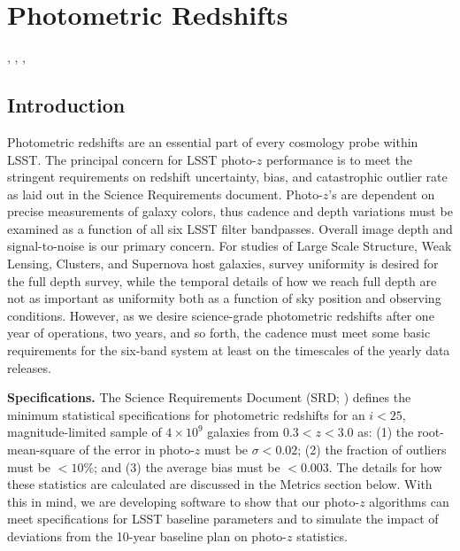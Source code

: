 %
%
%
%
%
%
\clearpage
\section{Photometric Redshifts}
\def\secname{photoz}\label{sec:\secname}

,
,
,

\subsection{Introduction}

Photometric redshifts are an essential part of
every cosmology probe within LSST.  The principal concern for LSST
photo-$z$ performance is to meet the stringent requirements on redshift
uncertainty, bias, and catastrophic outlier rate as laid out in the
Science Requirements document. Photo-$z$'s are dependent on precise
measurements of galaxy colors, thus cadence and depth variations must be
examined as a function of all six LSST filter bandpasses.  Overall image
depth and signal-to-noise is our primary concern. For studies of Large
Scale Structure, Weak Lensing, Clusters, and Supernova host galaxies,
survey uniformity is desired for the full depth survey, while the
temporal details of how we reach full depth are not as important as
uniformity both as a function of sky position and observing conditions.
However, as we desire science-grade photometric redshifts after one year
of operations, two years, and so forth, the cadence must meet some basic
requirements for the six-band system at least on the timescales of the
yearly data releases.


\textbf{Specifications.} The Science Requirements Document (SRD; \citealt{LPM-17}) defines
the minimum statistical specifications for photometric redshifts for an
$i<25$, magnitude-limited sample of $4\times10^9$ galaxies from
$0.3<z<3.0$ as: (1) the root-mean-square of the error in photo-$z$
must be $\sigma < 0.02$; (2) the fraction of outliers must be $<10\%$;
and (3) the average bias must be $<0.003$.
The details for how these statistics are calculated are discussed in the Metrics section below.
With this in mind, we are developing software to show that our photo-$z$ algorithms
can meet specifications for LSST baseline parameters and to simulate the
impact of deviations from the 10-year baseline plan on photo-$z$
statistics.

